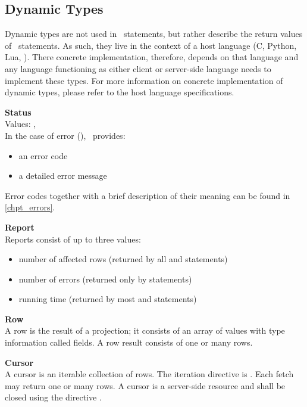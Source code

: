 \subsection{Dynamic Types}
Dynamic types are not used in \sql\ statements,
but rather describe the return values of \sql\
statements. As such, they live in the context
of a host language (C, Python, Lua, \etc).
There concrete implementation, therefore,
depends on that language and any language
functioning as either client or server-side language
needs to implement these types.
For more information on concrete implementation
of dynamic types, please refer to the
host language  specifications.

\begin{minipage}{\textwidth}
\textbf{Status}\\
Values: , \\
In the case of error (\acronym{nok}), \nowdb\ provides:
\begin{itemize}
\item an error code
\item a detailed error message
\end{itemize}
Error codes together with a brief description
of their meaning can be found in \ref{chpt_errors}.
\end{minipage}

\begin{minipage}{\textwidth}
\textbf{Report}\\
Reports consist of up to three values:
\begin{itemize}
\item number of affected rows
(returned by all  and  statements)
\item number of errors
(returned only by  statements)
\item running time
(returned by most  and  statements)
\end{itemize}
\end{minipage}

\begin{minipage}{\textwidth}
\textbf{Row}\\
A row is the result of a projection;
it consists of an array of values
with type information called fields.
A row result consists of one or many rows.
\end{minipage}

\begin{minipage}{\textwidth}
\textbf{Cursor}\\
A cursor is an iterable collection of rows.
The iteration directive is .
Each fetch may return one or many rows.
A cursor is a server-side resource
and shall be closed using the directive .
\end{minipage}

